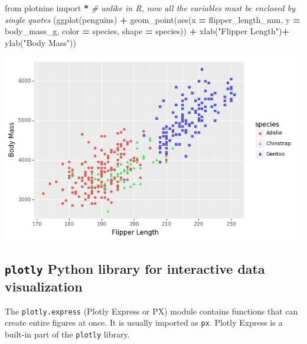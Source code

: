 \documentclass[
]{book}
\newenvironment{Shaded}{\begin{snugshade}}{\end{snugshade}}
\newcommand{\CommentTok}[1]{\textcolor[rgb]{0.56,0.35,0.01}{\textit{#1}}}
\newcommand{\ImportTok}[1]{#1}
\newcommand{\NormalTok}[1]{#1}
\newcommand{\OperatorTok}[1]{\textcolor[rgb]{0.81,0.36,0.00}{\textbf{#1}}}
\newcommand{\StringTok}[1]{\textcolor[rgb]{0.31,0.60,0.02}{#1}}
\begin{document}
\begin{Shaded}
\begin{Highlighting}[]
\ImportTok{from}\NormalTok{ plotnine }\ImportTok{import} \OperatorTok{*}
\CommentTok{\# unlike in R, now all the variables must be enclosed by single quotes}
\NormalTok{(ggplot(penguins) }\OperatorTok{+}
\NormalTok{  geom\_point(aes(x }\OperatorTok{=} \StringTok{\textquotesingle{}flipper\_length\_mm\textquotesingle{}}\NormalTok{,}
\NormalTok{                  y }\OperatorTok{=} \StringTok{\textquotesingle{}body\_mass\_g\textquotesingle{}}\NormalTok{,}
\NormalTok{                  color }\OperatorTok{=} \StringTok{\textquotesingle{}species\textquotesingle{}}\NormalTok{,}
\NormalTok{                  shape }\OperatorTok{=} \StringTok{\textquotesingle{}species\textquotesingle{}}\NormalTok{)) }\OperatorTok{+}
\NormalTok{  xlab(}\StringTok{"Flipper Length"}\NormalTok{)}\OperatorTok{+}
\NormalTok{  ylab(}\StringTok{"Body Mass"}\NormalTok{))}
\end{Highlighting}
\end{Shaded}

\begin{center}\includegraphics[width=0.9\linewidth]{fig/Viz_chap/3_plotnine} \end{center}

\hypertarget{plotly-python-library-for-interactive-data-visualization}{%
\subsection{\texorpdfstring{\texttt{plotly} Python library for interactive data visualization}{plotly Python library for interactive data visualization}}\label{plotly-python-library-for-interactive-data-visualization}}

The \texttt{plotly.express} (Plotly Express or PX) module contains functions that can create entire figures at once. It is usually imported as \texttt{px}. Plotly Express is a built-in part of the \texttt{plotly} library.
\end{document}
